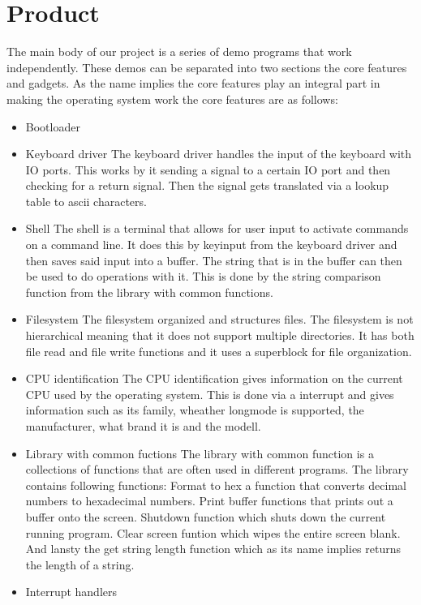 \section{Product}

The main body of our project is a series of demo programs that work independently.
These demos can be separated into two sections the core features and gadgets.
As the name implies the core features play an integral part in making the operating
system work the core features are as follows:


\begin{itemize}

\item Bootloader
\item Keyboard driver
The keyboard driver handles the input of the keyboard with IO ports. This works
by it sending a signal to a certain IO port and then checking for a return signal.
Then the signal gets translated via a lookup table to ascii characters.
\item Shell
The shell is a terminal that allows for user input to activate commands on a command
line. It does this by keyinput from the keyboard driver and then saves said input
into a buffer. The string that is in the buffer can then be used to do operations with
it. This is done by the string comparison function from the library with common functions.
\item Filesystem
The filesystem organized and structures files. The filesystem is not hierarchical meaning
that it does not support multiple directories. It has both file read and file write functions
and it uses a superblock for file organization.
\item CPU identification
The CPU identification gives information on the current CPU used by the operating system.
This is done via a interrupt and gives information such as its family, wheather longmode is
supported, the manufacturer, what brand it is and the modell.
\item Library with common fuctions
The library with common function is a collections of functions that are often used in different
programs. The library contains following functions: Format to hex a function that converts decimal
numbers to hexadecimal numbers. Print buffer functions that prints out a buffer onto the screen. 
Shutdown function which shuts down the current running program. Clear screen funtion which wipes
the entire screen blank. And lansty the get string length function which as its name implies returns
the length of a string.
\item Interrupt handlers


\end{itemize}
